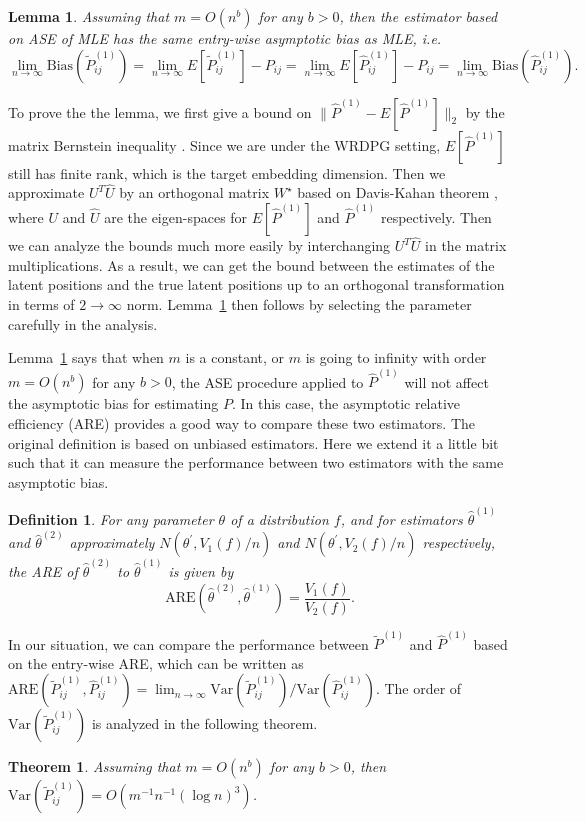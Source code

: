 \documentclass[a4paper]{article}
\newtheorem{lemma}[fact]{Lemma}
\newtheorem{theorem}[fact]{Theorem}
\newtheorem{definition}[fact]{Definition}
\renewcommand{\hat}{\widehat}
\begin{document}
\begin{lemma}
\label{lm:L1Consistent}
Assuming that $m = O(n^b)$ for any $b > 0$, then the estimator based on ASE of MLE has the same entry-wise asymptotic bias as MLE, i.e.
\[
	\lim_{n \to \infty} \mathrm{Bias}(\widetilde{P}_{ij}^{(1)}) = \lim_{n \to \infty} E[\widetilde{P}_{ij}^{(1)}] - P_{ij} = \lim_{n \to \infty} E[\hat{P}^{(1)}_{ij}] - P_{ij}
    = \lim_{n \to \infty} \mathrm{Bias}(\hat{P}_{ij}^{(1)}).
\]
\end{lemma}

To prove the the lemma, we first give a bound on $\|\hat{P}^{(1)} - E[\hat{P}^{(1)}]\|_2$ by the matrix Bernstein inequality \citep{tropp2012user}. Since we are under the WRDPG setting, $E[\hat{P}^{(1)}]$ still has finite rank, which is the target embedding dimension. Then we approximate $U^T \hat{U}$ by an orthogonal matrix $W^{\star}$ based on Davis-Kahan theorem \citep{davis1970rotation}, where $U$ and $\hat{U}$ are the eigen-spaces for $E[\hat{P}^{(1)}]$ and $\hat{P}^{(1)}$ respectively. Then we can analyze the bounds much more easily by interchanging $U^T \hat{U}$ in the matrix multiplications. As a result, we can get the bound between the estimates of the latent positions and the true latent positions up to an orthogonal transformation in terms of $2 \to \infty$ norm. Lemma~\ref{lm:L1Consistent} then follows by selecting the parameter carefully in the analysis.

Lemma~\ref{lm:L1Consistent} says that when $m$ is a constant, or $m$ is going to infinity with order $m = O(n^b)$ for any $b > 0$, the ASE procedure applied to $\hat{P}^{(1)}$ will not affect the asymptotic bias for estimating $P$.
In this case, the asymptotic relative efficiency (ARE) \citep{serfling2011asymptotic} provides a good way to compare these two estimators. The original definition is based on unbiased estimators. Here we extend it a little bit such that it can measure the performance between two estimators with the same asymptotic bias.

\begin{definition}
For any parameter $\theta$ of a distribution $f$, and for estimators $\hat{\theta}^{(1)}$ and $\hat{\theta}^{(2)}$ approximately $N(\theta^{\prime}, V_1(f)/n)$ and $N(\theta^{\prime}, V_2(f)/n)$ respectively, the ARE of $\hat{\theta}^{(2)}$ to $\hat{\theta}^{(1)}$ is given by
\[
	\mathrm{ARE}(\hat{\theta}^{(2)}, \hat{\theta}^{(1)}) = \frac{V_1(f)}{V_2(f)}.
\]
\end{definition}

In our situation, we can compare the performance between $\widetilde{P}^{(1)}$ and $\hat{P}^{(1)}$ based on the entry-wise ARE, which can be written as $\mathrm{ARE}(\widetilde{P}^{(1)}_{ij}, \hat{P}^{(1)}_{ij}) = \lim_{n \to \infty} \mathrm{Var}(\widetilde{P}_{ij}^{(1)})/\mathrm{Var}(\hat{P}_{ij}^{(1)})$. The order of $\mathrm{Var}(\widetilde{P}_{ij}^{(1)})$ is analyzed in the following theorem.
\begin{theorem}
\label{thm:VarASEL1}
Assuming that $m = O(n^b)$ for any $b > 0$, then $\mathrm{Var}(\widetilde{P}_{ij}^{(1)}) = O(m^{-1} n^{-1} (\log n)^3)$.
\end{theorem}
\end{document}

